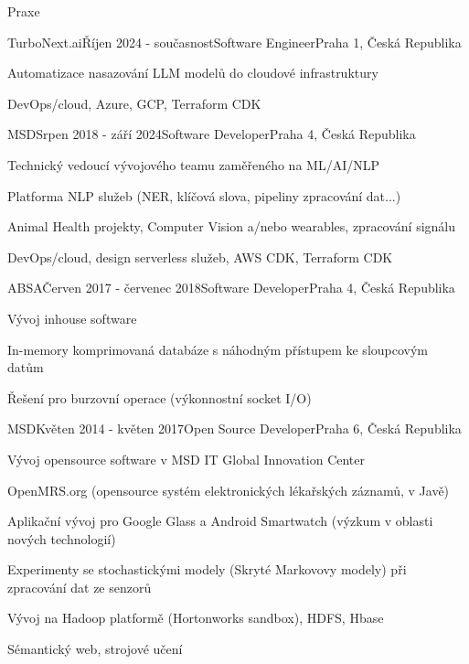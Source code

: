 \documentclass{resume} %
\begin{document}
\begin{rSection}{Praxe}

\begin{rSubsection}{TurboNext.ai}{\v{R}\'{i}jen 2024 - sou\v{c}asnost}{Software Engineer}{Praha 1, \v{C}esk\'{a} Republika}
\item Automatizace nasazov\'{a}n\'i LLM model\r{u} do cloudov\'{e} infrastruktury
\item DevOps/cloud, Azure, GCP, Terraform CDK
\end {rSubsection}


\begin{rSubsection}{MSD}{Srpen 2018 - z\'{a}\v{r}\'{i} 2024}{Software Developer}{Praha 4, \v{C}esk\'{a} Republika}
\item Technick\'{y} vedouc\'{i} v\'{y}vojov\'{e}ho teamu zam\v{e}\v{r}en\'{e}ho na ML/AI/NLP
\item Platforma NLP slu\v{z}eb (NER, kl\'{i}\v{c}ov\'{a} slova, pipeliny zpracov\'{a}n\'{i} dat...)
\item Animal Health projekty, Computer Vision a/nebo wearables, zpracov\'{a}n\'{i} sign\'{a}lu
\item DevOps/cloud, design serverless slu\v{z}eb, AWS CDK, Terraform CDK
\end {rSubsection}


\begin{rSubsection}{ABSA}{\v{C}erven 2017 - \v{c}ervenec 2018}{Software Developer}{Praha 4, \v{C}esk\'{a} Republika}
\item V\'{y}voj inhouse software
\item In-memory komprimovan\'{a} datab\'{a}ze s n\'{a}hodn\'{y}m p\v{r}\'{i}stupem ke sloupcov\'{y}m dat\r{u}m
\item \v{R}e\v{s}en\'{i} pro burzovn\'{i} operace (v\'{y}konnostn\'{i} socket I/O)
\end{rSubsection}


\begin{rSubsection}{MSD}{Kv\v{e}ten 2014 - kv\v{e}ten 2017}{Open Source Developer}{Praha 6, \v{C}esk\'{a} Republika}
\item V\'{y}voj opensource software v MSD IT Global Innovation Center
\item OpenMRS.org (opensource syst\'{e}m elektronick\'{y}ch l\'{e}ka\v{r}sk\'{y}ch z\'{a}znam\r{u}, v Jav\v{e})
\item Aplika\v{c}n\'{i} v\'{y}voj pro Google Glass a Android Smartwatch (v\'{y}zkum v oblasti nov\'{y}ch technologi\'{i})
\item Experimenty se stochastick\'{y}mi modely (Skryt\'{e} Markovovy modely) p\v{r}i zpracov\'{a}n\'{i} dat ze senzor\r{u}
\item V\'{y}voj na Hadoop platform\v{e} (Hortonworks sandbox), HDFS, Hbase
\item S\'{e}mantick\'{y} web, strojov\'{e} u\v{c}en\'{i}
\end{rSubsection}


\end{rSection}
\end{document}
